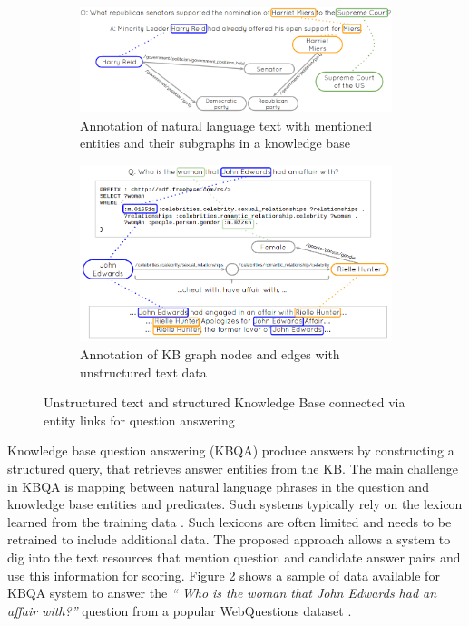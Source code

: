 \begin{figure}
\centering
 \begin{subfigure}[t]{0.45\textwidth}
 \includegraphics[width=\textwidth]{img/text_kb}
 \caption{Annotation of natural language text with mentioned entities and their subgraphs in a knowledge base}
 \label{fig:kb2text}
 \end{subfigure}
 \begin{subfigure}[t]{0.45\textwidth}
 \centering
 \includegraphics[width=\textwidth]{img/kb_text}
 \caption{Annotation of KB graph nodes and edges with unstructured text data}
  \label{fig:text2kb}
 \end{subfigure}
\label{fig:text_kb}
\vspace{-0.2cm}
\caption{Unstructured text and structured Knowledge Base connected via entity links for question answering}
\end{figure}

Knowledge base question answering (KBQA) produce answers by constructing a structured query, that retrieves answer entities from the KB.
The main challenge in KBQA is mapping between natural language phrases in the question and knowledge base entities and predicates.
Such systems typically rely on the lexicon learned from the training data \cite{bastmore:cikm:2015:aquu,BerantCFL13:sempre,BerantL14:parasempre,yih:ACL:2015:STAGG,yao-scratch-qa-naacl2015}.
Such lexicons are often limited and needs to be retrained to include additional data.
The proposed approach allows a system to dig into the text resources that mention question and candidate answer pairs and use this information for scoring.
Figure \ref{fig:text2kb} shows a sample of data available for KBQA system to answer the \textit{`` Who is the woman that John Edwards had an affair with?''} question from a popular WebQuestions dataset \cite{BerantCFL13:sempre}.

